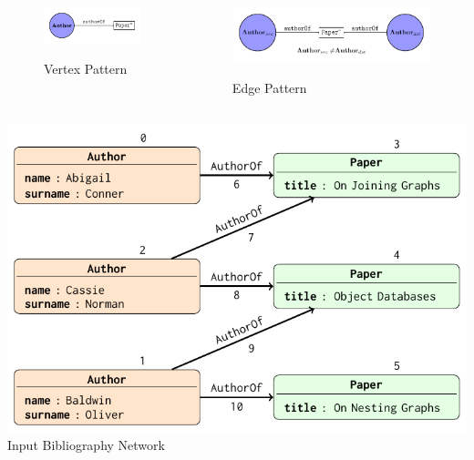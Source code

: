 \begin{lucido}
	\begin{columns}[onlytextwidth]
		\begin{column}{.45\textwidth}
			\begin{figure}
				\includegraphics[scale=0.6]{../images/nesting/patterns/00_vertex_pattern.pdf}
				\begin{center}
					Vertex Pattern
				\end{center}
			\end{figure}
		\end{column}
		\hfill
		\begin{column}{.45\textwidth}
			\begin{figure}
				\includegraphics[scale=0.45]{../images/nesting/patterns/00_path_pattern.pdf}
				\begin{center}
					Edge Pattern
				\end{center}
			\end{figure}			
		\end{column}
	\end{columns}
	\begin{center}
		\includegraphics[height=.5\textheight]{../images/nesting/patterns/04bibliography.pdf}\\
		Input Bibliography Network
	\end{center}
\end{lucido}

